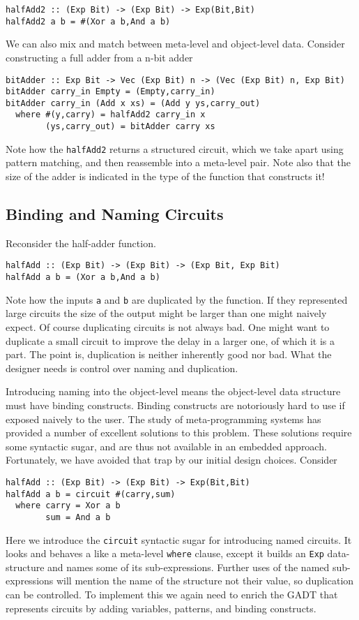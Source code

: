 \documentclass[10pt,twoside]{article}
\begin{document}
\begin{verbatim} 
halfAdd2 :: (Exp Bit) -> (Exp Bit) -> Exp(Bit,Bit)
halfAdd2 a b = #(Xor a b,And a b) 
\end{verbatim}

We can also mix and match between meta-level and object-level data.
Consider constructing a full adder from a n-bit adder

\begin{verbatim}
bitAdder :: Exp Bit -> Vec (Exp Bit) n -> (Vec (Exp Bit) n, Exp Bit)
bitAdder carry_in Empty = (Empty,carry_in) 
bitAdder carry_in (Add x xs) = (Add y ys,carry_out)
  where #(y,carry) = halfAdd2 carry_in x
        (ys,carry_out) = bitAdder carry xs
\end{verbatim}
Note how the {\tt halfAdd2} returns a structured circuit, which we take apart
using pattern matching, and then reassemble into a meta-level pair. Note also that the size of the
adder is indicated in the type of the function that constructs it!

\subsection{Binding and Naming Circuits}
Reconsider the half-adder function.
\begin{verbatim} 
halfAdd :: (Exp Bit) -> (Exp Bit) -> (Exp Bit, Exp Bit)
halfAdd a b = (Xor a b,And a b) 
\end{verbatim} 
Note how the inputs {\tt a} and {\tt b} are duplicated by the function.
If they represented large circuits the size of the output might be
larger than one might naively expect. Of course duplicating circuits
is not always bad. One might want to duplicate a small circuit to improve
the delay in a larger one, of which it is a part. The point is, duplication
is neither inherently good nor bad. What the designer needs is control over
naming and duplication.

Introducing naming into the object-level means the object-level data
structure must have binding constructs. Binding constructs are notoriously
hard to use if exposed naively to the user. The study of meta-programming
systems has provided a number of excellent solutions to this problem. These
solutions require some syntactic sugar, and are thus not available in an
embedded approach. Fortunately, we have avoided that trap by our initial
design choices. Consider
\begin{verbatim} 
halfAdd :: (Exp Bit) -> (Exp Bit) -> Exp(Bit,Bit)
halfAdd a b = circuit #(carry,sum) 
  where carry = Xor a b
        sum = And a b
\end{verbatim} 
Here we introduce the {\tt circuit} syntactic sugar for introducing
named circuits. It looks and behaves a like a meta-level {\tt where}
clause, except it builds an {\tt Exp} data-structure and names 
some of its sub-expressions. Further uses
of the named sub-expressions will mention the name of the structure
not their value, so duplication can be controlled.
To implement this we again need to enrich the GADT that represents circuits
by adding variables, patterns, and binding constructs. 
\end{document}
